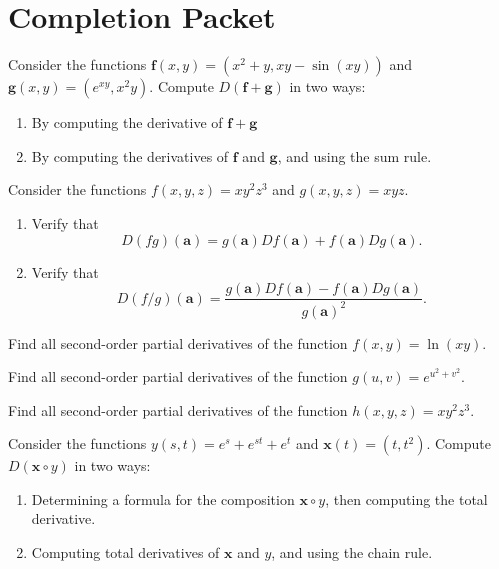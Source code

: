\documentclass{ximera}
\begin{document}
\section*{Completion Packet}

\begin{problem}
 Consider the functions $\mathbf{f}(x,y) = (x^2+y, xy-\sin(xy))$ and $\mathbf{g}(x,y) = (e^{xy}, x^2y)$. Compute $D(\mathbf{f} + \mathbf{g})$ in two ways:
\begin{enumerate}
\item By computing the derivative of $\mathbf{f} + \mathbf{g}$
\item By computing the derivatives of $\mathbf{f}$ and $\mathbf{g}$, and using the sum rule.
\end{enumerate}
\end{problem}

\begin{problem}
Consider the functions $f(x,y,z) = xy^2z^3$ and $g(x,y,z) = xyz$.
\begin{enumerate}
\item Verify that \[D(fg)(\mathbf{a})=g(\mathbf{a})Df(\mathbf{a})+f(\mathbf{a})Dg(\mathbf{a}).\]
\item Verify that \[D(f/g)(\mathbf{a})=\frac{g(\mathbf{a})Df(\mathbf{a})-f(\mathbf{a})Dg(\mathbf{a})}{g(\mathbf{a})^2}.\]
\end{enumerate}
\end{problem}

\begin{problem}
 Find all second-order partial derivatives of the function $f(x,y) = \ln(xy)$.
 \end{problem}

\begin{problem}
 Find all second-order partial derivatives of the function $g(u, v) = e^{u^2+v^2}$.
 \end{problem}

\begin{problem}
Find all second-order partial derivatives of the function $h(x,y,z) = xy^2z^3$.
\end{problem}

\begin{problem}
Consider the functions $y(s,t) = e^s + e^{st} + e^t$ and $\mathbf{x}(t) = (t, t^2)$. Compute $D(\mathbf{x}\circ y)$ in two ways:
\begin{enumerate}
\item Determining a formula for the composition $\mathbf{x}\circ y$, then computing the total derivative.
\item Computing total derivatives of $\mathbf{x}$ and $y$, and using the chain rule.
\end{enumerate}
\end{problem}
\end{document}
